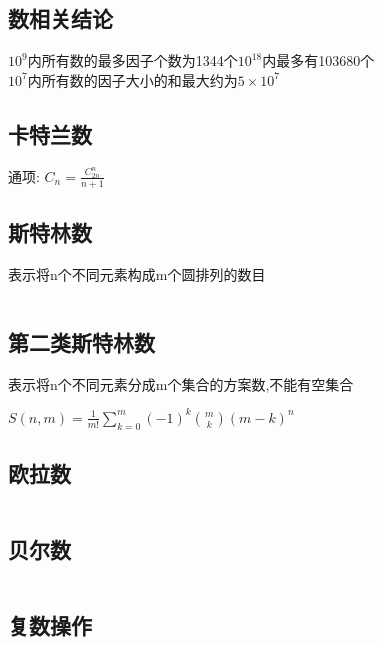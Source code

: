 \documentclass[twocolumn,a4]{article}
\begin{document}
\subsection{数相关结论}
$10^{9}$内所有数的最多因子个数为1344个$10^{18}$内最多有103680个\\
$10^{7}$内所有数的因子大小的和最大约为$5\times 10^{7}$\\
\subsection{卡特兰数}
\begin{Large}
    通项: $C_n=\frac{C_{2n}^{n}}{n+1}$
\end{Large}

\subsection{斯特林数}
表示将n个不同元素构成m个圆排列的数目
\begin{lstlisting}

\end{lstlisting}

\subsection{第二类斯特林数}
表示将n个不同元素分成m个集合的方案数,不能有空集合\\
\begin{large}
    $S(n,m)=\frac{1}{m!}\sum_{k=0}^{m}(-1)^{k}\binom{m}{k}(m-k)^{n} $
\end{large}

\subsection{欧拉数}
\begin{lstlisting}

\end{lstlisting}

\subsection{贝尔数}
\begin{lstlisting}

\end{lstlisting}

\subsection{复数操作}
\begin{lstlisting}

\end{lstlisting}
\end{document}
